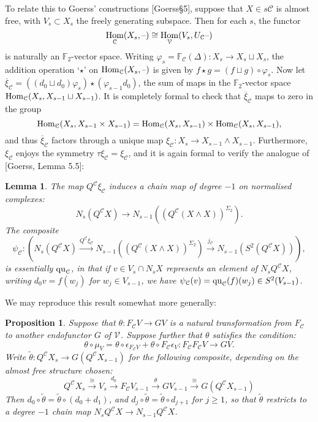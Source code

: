 \documentclass[11pt]{amsart}
\theoremstyle{plain}
\newtheorem{lem}[thm]{Lemma}
\newtheorem{prop}[thm]{Proposition}
\theoremstyle{definition}
\DeclareMathOperator{\Hom}{Hom}
\newcommand{\DASH}{\textup{--}}
\let\phi\varphi
\renewcommand{\to}{\longrightarrow}
\newcommand{\calC}{\mathcal{C}}
\newcommand{\calV}{\mathcal{V}}
\theoremstyle{plain}
\newcommand{\vect}[2]{\calV^{#1}_{#2}}
\newcommand{\quadratic}{\textup{qu}}
\newcommand{\F}{\mathbb{F}}
\begin{document}
\begin{Conventions and notation}
To relate this to Goerss' constructions [Goerss\S5], suppose that $X\in s\calC$ is almost free, with $V_s\subset X_s$ the freely generating subspace. Then for each $s$, the functor 
\[\Hom_\calC(X_s,\DASH)\cong \Hom_\calV(V_s,U_\calC\DASH)\]
is naturally an $\F_2$-vector space. Writing $\phi_s=\F_\calC(\Delta):X_s\to X_s\sqcup X_s$, the addition operation `$\star$' on $\Hom_\calC(X_s,\DASH)$ is given by $f\star g= (f\sqcup g)\circ\phi_s$. Now let
$\overline{\xi}_\calC=((d_0\sqcup d_0)\phi_s)\star(\phi_{s-1}d_0)$, the sum of maps in the $\F_2$-vector space $\textup{Hom}_\calC(X_s,X_{s-1}\sqcup X_{s-1})$. It is completely formal to check that $\overline{\xi}_\calC$ maps to zero in the group
\[\textup{Hom}_\calC(X_s,X_{s-1}\times X_{s-1})=\textup{Hom}_\calC(X_s,X_{s-1})\times \textup{Hom}_\calC(X_s,X_{s-1}),\]
and thus $\overline{\xi}_\calC$ factors through a unique map $\xi_\calC:X_s\to X_{s-1}\wedge X_{s-1}$. Furthermore, $\xi_\calC$ enjoys the symmetry $\tau\xi_\calC=\xi_\calC$, and it is again formal to verify the analogue of [Goerss, Lemma 5.5]:
\begin{lem}
The map $Q^\calC\xi_\calC$ induces a chain map of degree $-1$ on normalised complexes:
\[N_s(Q^{\calC}X)\to N_{s-1}((Q^{\calC}(X\wedge X))^{\Sigma_2}).\]
The composite
\[\psi_\calC:\left(N_s(Q^{\calC}X)\overset{Q^\calC\xi_\calC}{\to} N_{s-1}((Q^{\calC}(X\wedge X))^{\Sigma_2})\overset{j_\calC}{\to} N_{s-1}(S^2(Q^{\calC}X))\right),\]
is essentially $\quadratic_\calC$, in that if $v\in V_s\cap N_sX$ represents an element of $N_sQ^\calC X$, writing $d_0v=f(w_j)$ for $w_j\in V_{s-1}$, we have $\psi_\calC(v)=\quadratic_\calC(f)(w_j)\in S^2(V_{s-1})$.
\end{lem}
We may reproduce this result somewhat more generally:
\begin{prop}\label{general CohOpns given irreducibility}
Suppose that $\theta:F_\calC V\to GV$ is a natural transformation from $F_\calC$ to another endofunctor $G$ of $\vect{}{}$. Suppose further that $\theta$ satisfies the condition:
\[\theta\circ\mu_V=\theta\circ \epsilon_{F_\calC V} +\theta\circ {F_\calC \epsilon_V}:F_\calC F_\calC V\to G V.\]
Write $\widetilde{\theta}:Q^{\calC}X_s\to G(Q^{\calC}X_{s-1})$ for the following composite, depending on the almost free structure chosen:
\[Q^{\calC}X_s\overset{\cong}{\to} V_s\overset{d_0}{\to}F_{\calC}V_{s-1}\overset{\theta}{\to}GV_{s-1}\overset{\cong}{\to}G(Q^{\calC}X_{s-1})\]
Then $d_0\circ\widetilde{\theta}=\widetilde{\theta}\circ(d_0+d_1)$, and $d_j\circ\widetilde{\theta}=\widetilde{\theta}\circ d_{j+1}$ for $j\geq1$, so that $\widetilde{\theta}$ restricts to a degree $-1$ chain map $N_sQ^\calC X\to N_{s-1}Q^\calC X$.

\end{prop}
\end{Conventions and notation}
\end{document}

